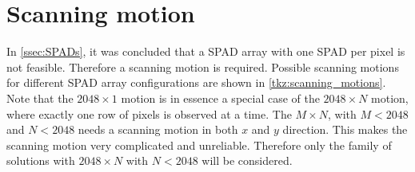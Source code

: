 \section{Scanning motion}\label{ssec:scanning_motion}
In \cref{ssec:SPADs}, it was concluded that a SPAD array with one SPAD per pixel is not feasible. Therefore a scanning motion is required. Possible scanning motions for different SPAD array configurations are shown in \cref{tkz:scanning_motions}. Note that the $2048\times1$ motion is in essence a special case of the $2048\times N$ motion, where exactly one row of pixels is observed at a time. The $M\times N$, with $M<2048$ and $N<2048$ needs a scanning motion in both $x$ and $y$ direction. This makes the scanning motion very complicated and unreliable. Therefore only the family of solutions with $2048\times N$ with $N<2048$ will be considered.



